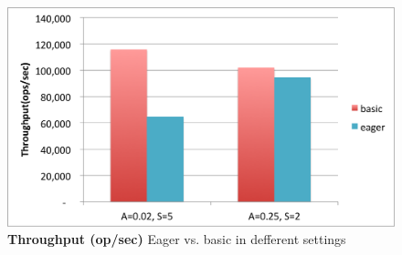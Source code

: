 \begin{figure}[htb]
\includegraphics[width=\figw]{Figs/eager-throughput.png}
\caption{{\bf Throughput (op/sec)} Eager vs. basic in defferent settings 
}
\label{fig:eager-throughput}
\end{figure}



